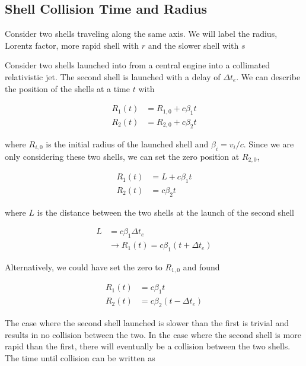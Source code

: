 \documentclass[linenumbers,twocolumn]{aastex631}
\begin{document}
\newpage




\begin{appendix}

\section{Shell Collision Time and Radius}

Consider two shells traveling along the same axis. We will label the radius, Lorentz factor,  more rapid shell with $r$ and the slower shell with $s$

Consider two shells launched into from a central engine into a collimated relativistic jet. The second shell is launched with a delay of $\Delta t_e$. We can describe the position of the shells at a time $t$ with

\begin{align}
	R_1(t) &= R_{1,0} + c\beta_1 t \\
	R_2(t) &= R_{2,0} + c\beta_2 t
\end{align}

where $R_{i,0}$ is the initial radius of the launched shell and $\beta_i = v_i/c$. Since we are only considering these two shells, we can set the zero position at $R_{2,0}$, 

\begin{align}
	R_1(t) &= L + c\beta_1 t \\
	R_2(t) &= c\beta_2 t
\end{align}

where $L$ is the distance between the two shells at the launch of the second shell

\begin{align}
	L &= c\beta_1 \Delta t_e\\ 
	&\rightarrow R_1(t) = c\beta_1(t+\Delta t_e)
\end{align}

Alternatively, we could have set the zero to $R_{1,0}$ and found 

\begin{align}
	R_1(t) &= c\beta_1 t \\
	R_2(t) &= c\beta_2 (t-\Delta t_e)
\end{align}

The case where the second shell launched is slower than the first is trivial and results in no collision between the two. In the case where the second shell is more rapid than the first, there will eventually be a collision between the two shells. The time until collision can be written as


\end{appendix}
\end{document}
